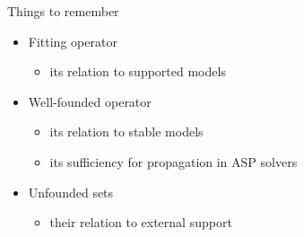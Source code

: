 \begin{frame}{Things to remember}
  \bigskip
  \begin{itemize}
  \item Fitting operator
    \begin{itemize}\normalsize
    \item<only@2> its relation to supported models
    \end{itemize}
    \smallskip
  \item Well-founded operator
    \begin{itemize}\normalsize
    \item<only@2> its relation to stable models
    \item<only@2> its sufficiency for propagation in ASP solvers
    \end{itemize}
    \bigskip
  \item Unfounded sets
    \begin{itemize}\normalsize
    \item<only@2> their relation to external support
    \end{itemize}
  \end{itemize}
\end{frame}
%
